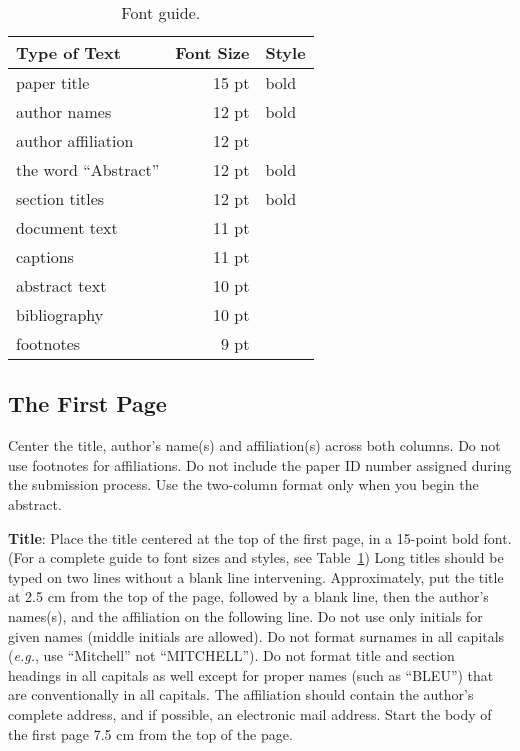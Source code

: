 \documentclass[11pt,a4paper]{article}
\begin{document}
\begin{table}[h]
\begin{center}
\begin{tabular}{|l|rl|}
\hline \bf Type of Text & \bf Font Size & \bf Style \\ \hline
paper title & 15 pt & bold \\
author names & 12 pt & bold \\
author affiliation & 12 pt & \\
the word ``Abstract'' & 12 pt & bold \\
section titles & 12 pt & bold \\
document text & 11 pt  &\\
captions & 11 pt & \\
abstract text & 10 pt & \\
bibliography & 10 pt & \\
footnotes & 9 pt & \\
\hline
\end{tabular}
\end{center}
\caption{\label{font-table} Font guide. }
\end{table}

\subsection{The First Page}
\label{ssec:first}

Center the title, author's name(s) and affiliation(s) across both
columns. Do not use footnotes for affiliations. Do not include the
paper ID number assigned during the submission process. Use the
two-column format only when you begin the abstract.

{\bf Title}: Place the title centered at the top of the first page, in
a 15-point bold font. (For a complete guide to font sizes and styles,
see Table~\ref{font-table}) Long titles should be typed on two lines
without a blank line intervening. Approximately, put the title at 2.5
cm from the top of the page, followed by a blank line, then the
author's names(s), and the affiliation on the following line. Do not
use only initials for given names (middle initials are allowed). Do
not format surnames in all capitals ({\em e.g.}, use ``Mitchell'' not
``MITCHELL'').  Do not format title and section headings in all
capitals as well except for proper names (such as ``BLEU'') that are
conventionally in all capitals.  The affiliation should contain the
author's complete address, and if possible, an electronic mail
address. Start the body of the first page 7.5 cm from the top of the
page.
\end{document}

